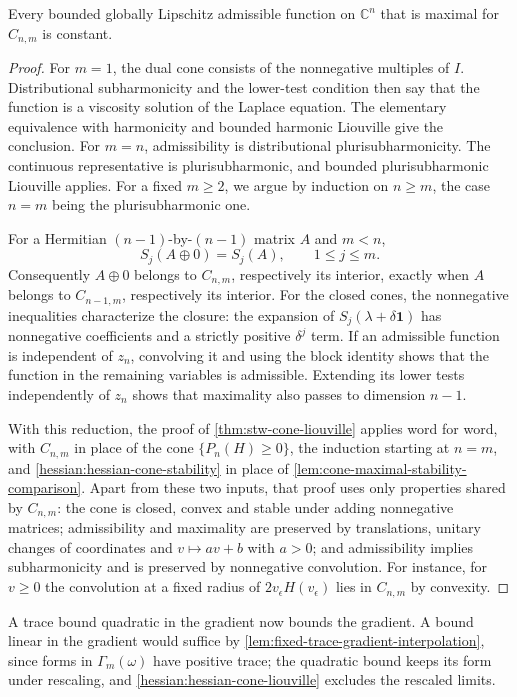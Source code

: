 \begin{theorem}\label{hessian:hessian-cone-liouville}
Every bounded globally Lipschitz admissible function on $\mathbb C^n$ that is maximal for $C_{n,m}$ is constant.
\end{theorem}
\begin{proof}
For $m=1$, the dual cone consists of the nonnegative multiples of $I$. Distributional subharmonicity and the lower-test condition then say that the function is a viscosity solution of the Laplace equation. The elementary equivalence with harmonicity and bounded harmonic Liouville give the conclusion. For $m=n$, admissibility is distributional plurisubharmonicity. The continuous representative is plurisubharmonic, and bounded plurisubharmonic Liouville applies.
For a fixed $m\geq2$, we argue by induction on $n\geq m$, the case $n=m$ being the plurisubharmonic one.

For a Hermitian $(n-1)$-by-$(n-1)$ matrix $A$ and $m<n$,
\[
 S_j(A\oplus0)=S_j(A),\qquad 1\leq j\leq m.
\]
Consequently $A\oplus0$ belongs to $C_{n,m}$, respectively its interior, exactly when $A$ belongs to $C_{n-1,m}$, respectively its interior. For the closed cones, the nonnegative inequalities characterize the closure: the expansion of $S_j(\lambda+\delta\mathbf1)$ has nonnegative coefficients and a strictly positive $\delta^j$ term. If an admissible function is independent of $z_n$, convolving it and using the block identity shows that the function in the remaining variables is admissible. Extending its lower tests independently of $z_n$ shows that maximality also passes to dimension $n-1$.

With this reduction, the proof of \cref{thm:stw-cone-liouville} applies word for word, with $C_{n,m}$ in place of the cone $\{P_n(H)\geq0\}$, the induction starting at $n=m$, and \cref{hessian:hessian-cone-stability} in place of \cref{lem:cone-maximal-stability-comparison}. Apart from these two inputs, that proof uses only properties shared by $C_{n,m}$: the cone is closed, convex and stable under adding nonnegative matrices; admissibility and maximality are preserved by translations, unitary changes of coordinates and $v\mapsto av+b$ with $a>0$; and admissibility implies subharmonicity and is preserved by nonnegative convolution. For instance, for $v\geq0$ the convolution at a fixed radius of $2v_\epsilon H(v_\epsilon)$ lies in $C_{n,m}$ by convexity.
\end{proof}

A trace bound quadratic in the gradient now bounds the gradient. A
bound linear in the gradient would suffice by
\cref{lem:fixed-trace-gradient-interpolation}, since forms in
$\Gamma_m(\omega)$ have positive trace; the quadratic bound keeps its
form under rescaling, and \cref{hessian:hessian-cone-liouville} excludes
the rescaled limits.

